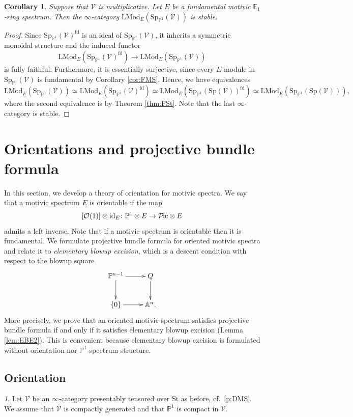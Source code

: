 \documentclass{amsart}
\theoremstyle{plain}
\newtheorem{corollary}[theorem]{Corollary}
\theoremstyle{definition}
\theoremstyle{remark}
\newtheorem{p}[theorem]{}
\numberwithin{equation}{theorem}
\newcommand{\mcal}[1]{\mathcal{#1}}
\newcommand{\mbb}[1]{\mathbb{#1}}
\newcommand{\LMod}{\mathrm{LMod}}
\newcommand{\Sp}{\mathrm{Sp}}
\newcommand{\St}{\mathrm{St}}
\newcommand{\V}{\mathcal{V}}
\newcommand{\fd}{\mathrm{fd}}
\newcommand{\id}{\mathrm{id}}
\newcommand{\SpP}{\mathrm{Sp}_{\mathbb{P}^1}}
\newcommand{\Pic}{{\mathcal{P}\mspace{-2.0mu}\mathrm{ic}}}
\begin{document}
\begin{corollary}\label{cor:FSt2}
Suppose that $\V$ is multiplicative.
Let $E$ be a fundamental motivic $\mbb{E}_1$-ring spectrum.
Then the $\infty$-category $\LMod_E(\SpP(\V))$ is stable.
\end{corollary}
\begin{proof}
Since $\SpP(\V)^\fd$ is an ideal of $\SpP(\V)$, it inherits a symmetric monoidal structure and the induced functor
\[
	\LMod_E(\SpP(\V)^\fd) \to \LMod_E(\SpP(\V))
\]
is fully faithful.
Furthermore, it is essentially surjective, since every $E$-module in $\SpP(\V)$ is fundamental by Corollary \ref{cor:FMS}.
Hence, we have equivalences
\[
	\LMod_E(\SpP(\V)) \simeq \LMod_E(\SpP(\V)^\fd) \simeq \LMod_E(\SpP(\Sp(\V))^\fd) \simeq \LMod_E(\SpP(\Sp(\V))),
\]
where the second equivalence is by Theorem \ref{thm:FSt}.
Note that the last $\infty$-category is stable.
\end{proof}




\newpage

\section{Orientations and projective bundle formula}\label{OPB}

In this section, we develop a theory of orientation for motivic spectra.
We say that a motivic spectrum $E$ is orientable if the map
\[
	[\mcal{O}(1)]\otimes\id_E \colon \mbb{P}^1\otimes E\to \Pic\otimes E
\]
admits a left inverse.
Note that if a motivic spectrum is orientable then it is fundamental.
We formulate projective bundle formula for oriented motivic spectra and relate it to \textit{elementary blowup excision}, which is a descent condition with respect to the blowup square
\[
\xymatrix{
	\mbb{P}^{n-1} \ar[r] \ar[d] & Q \ar[d] \\
	\{0\} \ar[r] & \mbb{A}^n.
}
\]
More precisely, we prove that an oriented motivic spectrum satisfies projective bundle formula if and only if it satisfies elementary blowup excision (Lemma \ref{lem:EBE2}).
This is convenient because elementary blowup excision is formulated without orientation nor $\mbb{P}^1$-spectrum structure.


\subsection{Orientation}\label{Ori}

\begin{p}
Let $\V$ be an $\infty$-category presentably tensored over $\St$ as before, cf.\ \ref{p:DMS}.
We assume that $\V$ is compactly generated and that $\mbb{P}^1$ is compact in $\V$. 
\end{p}
\end{document}
